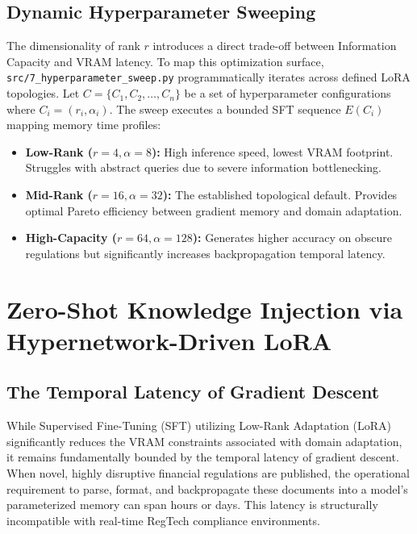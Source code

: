 \documentclass[12pt,a4paper]{report}
\begin{document}
\section{Dynamic Hyperparameter Sweeping}

The dimensionality of rank $r$ introduces a direct trade-off between Information Capacity and VRAM latency. To map this optimization surface, \texttt{src/7_hyperparameter_sweep.py} programmatically iterates across defined LoRA topologies. Let $C = \{C_1, C_2, \dots, C_n\}$ be a set of hyperparameter configurations where $C_i = (r_i, \alpha_i)$. The sweep executes a bounded SFT sequence $E(C_i)$ mapping memory time profiles:

\begin{itemize}
    \item \textbf{Low-Rank ($r=4, \alpha=8$):} High inference speed, lowest VRAM footprint. Struggles with abstract queries due to severe information bottlenecking.
    \item \textbf{Mid-Rank ($r=16, \alpha=32$):} The established topological default. Provides optimal Pareto efficiency between gradient memory and domain adaptation.
    \item \textbf{High-Capacity ($r=64, \alpha=128$):} Generates higher accuracy on obscure regulations but significantly increases backpropagation temporal latency.
\end{itemize}

\chapter{Zero-Shot Knowledge Injection via Hypernetwork-Driven LoRA}
\label{chap:doc_to_lora}

\section{The Temporal Latency of Gradient Descent}

While Supervised Fine-Tuning (SFT) utilizing Low-Rank Adaptation (LoRA) significantly reduces the VRAM constraints associated with domain adaptation, it remains fundamentally bounded by the temporal latency of gradient descent. When novel, highly disruptive financial regulations are published, the operational requirement to parse, format, and backpropagate these documents into a model's parameterized memory can span hours or days. This latency is structurally incompatible with real-time RegTech compliance environments. 
\end{document}
